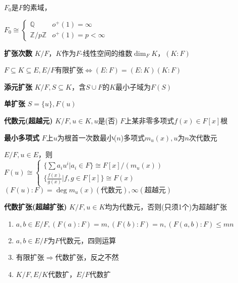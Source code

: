 \documentclass[a4paper,10pt]{ctexart}
\newcommand*{\setZ}{\mathbb{Z}}
\newcommand*{\setQ}{\mathbb{Q}}
\newcommand*{\impl}{\Rightarrow}
\renewcommand*{\iff}{\Leftrightarrow}
\renewcommand*{\leq}{\leqslant}
\newcommand*{\set}[1]{\{#1\}}
\begin{document}
\begin{multicols}{3}
    \begin{theorem}[素域同构]
        $F_0$是$F$的素域，

        $F_0 \cong \begin{cases}
                \setQ        & o^+(1) = \infty     \\
                \setZ/p\setZ & o^+(1) = p < \infty
            \end{cases}$
    \end{theorem}

    \textbf{扩张次数} $K/F$，$K$作为$F$-线性空间的维数$\dim_F K$，$(K:F)$

    \begin{theorem}[链式法则]
        $F\subseteq K \subseteq E, E/F$有限扩张$\iff (E:F)=(E:K)(K:F)$
    \end{theorem}

    \textbf{添元扩张} $K/F, S\subseteq K$，含$S\cup F$的$K$最小子域为$F(S)$

    \textbf{单扩张} $S = \set{u}, F(u)$

    \textbf{代数元(超越元)} $K/F, u\in K, u$是(否) $F$上某非零多项式$f(x)\in F[x]$根

    \textbf{最小多项式} $F$上$u$为根首一次数最小($n$)多项式$m_u(x), u$为$n$次代数元

    \begin{theorem}[单扩张定理]
        $E/F, u \in E$，则\\
        $F(u) \cong \begin{cases}
                \{ \sum a_i u^i | a_i \in F \} \cong F[x]/(m_u(x)) \\
                \{ \frac{f(x)}{g(x)} | f,g \in F[x] \} \cong F(x)
            \end{cases}$\\
        $(F(u)\!:\!F) = \deg m_u(x) (\text{代数元}), \infty (\text{超越元})$
    \end{theorem}

    \textbf{代数扩张(超越扩张)} $K/F, u \in K$均为代数元，否则(只须1个)为超越扩张

    \begin{theorem}[代数扩张性质]
        \hfil

        \begin{enumerate}
            \item $a, b \in E/F, (F(a)\!:\!F) \! = \! m, (F(b)\!:\!F) \! = \! n, (F(a,b)\!:\!F) \!\leq\! mn$
            \item $a,b \!\in\! E/F$为$F$代数元，四则运算\checkmark
            \item 有限扩张$\impl$代数扩张，反之不然
            \item $K/F, E/K$代数扩，$E/F$代数扩
        \end{enumerate}
    \end{theorem}


\end{multicols}
\end{document}
